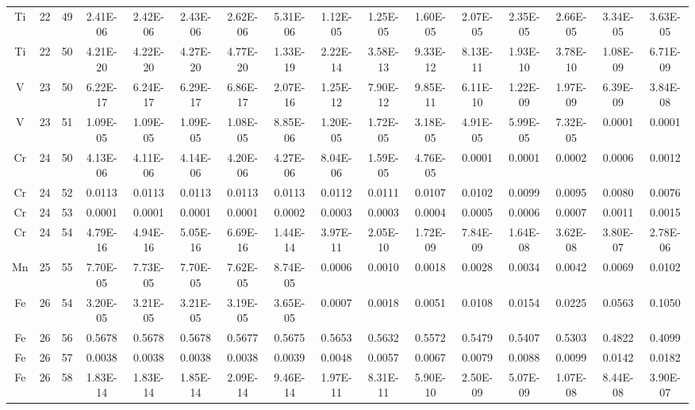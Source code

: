 {\begin{tabular}{|c|c|c|c|c|c|c|c|c|c|c|c|c|c|c|c|}
Ti & 22 & 49  & 2.41E-06 & 2.42E-06 & 2.43E-06 & 2.62E-06 & 5.31E-06 & 1.12E-05 & 1.25E-05 & 1.60E-05 & 2.07E-05 & 2.35E-05 & 2.66E-05 & 3.34E-05 & 3.63E-05 \\
Ti & 22 & 50  & 4.21E-20 & 4.22E-20 & 4.27E-20 & 4.77E-20 & 1.33E-19 & 2.22E-14 & 3.58E-13 & 9.33E-12 & 8.13E-11 & 1.93E-10 & 3.78E-10 & 1.08E-09 & 6.71E-09 \\
V  & 23 & 50  & 6.22E-17 & 6.24E-17 & 6.29E-17 & 6.86E-17 & 2.07E-16 & 1.25E-12 & 7.90E-12 & 9.85E-11 & 6.11E-10 & 1.22E-09 & 1.97E-09 & 6.39E-09 & 3.84E-08 \\
V  & 23 & 51  & 1.09E-05 & 1.09E-05 & 1.09E-05 & 1.08E-05 & 8.85E-06 & 1.20E-05 & 1.72E-05 & 3.18E-05 & 4.91E-05 & 5.99E-05 & 7.32E-05 & 0.0001   & 0.0001   \\
Cr & 24 & 50  & 4.13E-06 & 4.11E-06 & 4.14E-06 & 4.20E-06 & 4.27E-06 & 8.04E-06 & 1.59E-05 & 4.76E-05 & 0.0001   & 0.0001   & 0.0002   & 0.0006   & 0.0012   \\
Cr & 24 & 52  & 0.0113   & 0.0113   & 0.0113   & 0.0113   & 0.0113   & 0.0112   & 0.0111   & 0.0107   & 0.0102   & 0.0099   & 0.0095   & 0.0080   & 0.0076   \\
Cr & 24 & 53  & 0.0001   & 0.0001   & 0.0001   & 0.0001   & 0.0002   & 0.0003   & 0.0003   & 0.0004   & 0.0005   & 0.0006   & 0.0007   & 0.0011   & 0.0015   \\
Cr & 24 & 54  & 4.79E-16 & 4.94E-16 & 5.05E-16 & 6.69E-16 & 1.44E-14 & 3.97E-11 & 2.05E-10 & 1.72E-09 & 7.84E-09 & 1.64E-08 & 3.62E-08 & 3.80E-07 & 2.78E-06 \\
Mn & 25 & 55  & 7.70E-05 & 7.73E-05 & 7.70E-05 & 7.62E-05 & 8.74E-05 & 0.0006   & 0.0010   & 0.0018   & 0.0028   & 0.0034   & 0.0042   & 0.0069   & 0.0102   \\
Fe & 26 & 54  & 3.20E-05 & 3.21E-05 & 3.21E-05 & 3.19E-05 & 3.65E-05 & 0.0007   & 0.0018   & 0.0051   & 0.0108   & 0.0154   & 0.0225   & 0.0563   & 0.1050   \\
Fe & 26 & 56  & 0.5678   & 0.5678   & 0.5678   & 0.5677   & 0.5675   & 0.5653   & 0.5632   & 0.5572   & 0.5479   & 0.5407   & 0.5303   & 0.4822   & 0.4099   \\
Fe & 26 & 57  & 0.0038   & 0.0038   & 0.0038   & 0.0038   & 0.0039   & 0.0048   & 0.0057   & 0.0067   & 0.0079   & 0.0088   & 0.0099   & 0.0142   & 0.0182   \\
Fe & 26 & 58  & 1.83E-14 & 1.83E-14 & 1.85E-14 & 2.09E-14 & 9.46E-14 & 1.97E-11 & 8.31E-11 & 5.90E-10 & 2.50E-09 & 5.07E-09 & 1.07E-08 & 8.44E-08 & 3.90E-07 \\

\end{tabular}}
